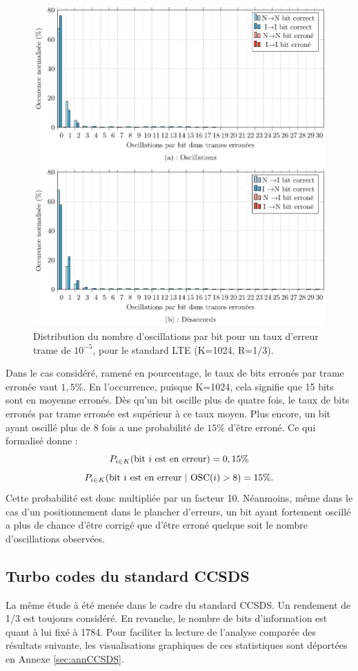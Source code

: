 \begin{figure}[!t]
	\centering
	\includegraphics[width=.8\textwidth]{main/ch2_fig/tikz/d_lte_10-5.pdf}
	\caption{Distribution du nombre d'oscillations par bit pour un taux d'erreur trame de $10^{-5}$, pour le standard LTE (K=1024, R=1/3). \label{fig:d_lte_10-5}}
\end{figure}

Dans le cas considéré, ramené en pourcentage, le taux de bits erronés par trame erronée vaut $1,5\%$. 
En l’occurrence, puisque K=1024, cela signifie que 15 bits sont en moyenne erronés. Dès qu'un bit oscille plus de quatre fois, 
le taux de bits erronés par trame erronée est supérieur à ce taux moyen. Plus encore, un bit ayant oscillé plus de 8 fois a une probabilité de $15\%$
d'être erroné. Ce qui formalisé donne :
\[P_{i \in K} (\textnormal{bit } i \textnormal{ est en erreur}) = 0,15 \%\]
\[P_{i \in K} (\textnormal{bit } i \textnormal{ est en erreur}\ |\ \textnormal{OSC}(i) > 8 ) = 15 \%.\]
Cette probabilité est donc multipliée par un facteur 10. Néanmoins, même dans le cas d'un positionnement 
dans le plancher d'erreurs, un bit ayant fortement oscillé a plus de chance d'être corrigé que d'être erroné quelque soit le nombre
d'oscillations observées.

\subsection{Turbo codes du standard CCSDS}\label{sec:osc_ccsds}
La même étude à été menée dans le cadre du standard CCSDS. Un rendement de 1/3 est toujours considéré. En revanche, le nombre 
de bits d'information est quant à lui fixé à 1784. Pour faciliter la lecture de l'analyse comparée des résultats suivante, 
les visualisations graphiques de ces statistiques sont déportées en Annexe \ref{sec:annCCSDS}.
